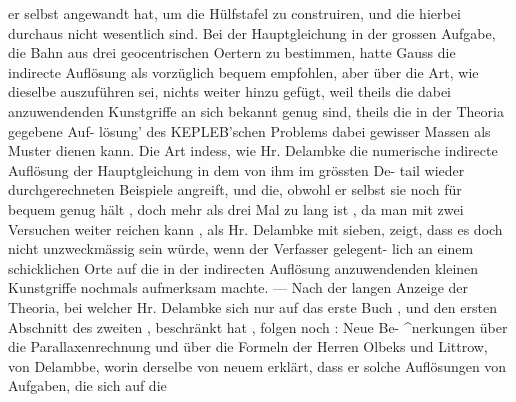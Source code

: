 \documentclass[12pt,a4paper]{article}
\begin{document}
er  selbst  angewandt  hat,  um  die  Hülfstafel  zu  construiren,  und  die hierbei  durchaus  nicht  wesentlich  sind.  Bei  der  Hauptgleichung  in  der  grossen  Aufgabe,  die  Bahn  aus drei  geocentrischen  Oertern  zu  bestimmen,  hatte  Gauss  die  indirecte  Auflösung  als  vorzüglich  bequem empfohlen,  aber  über  die  Art,  wie  dieselbe  auszuführen  sei,  nichts  weiter  hinzu  gefügt,  weil  theils  die dabei  anzuwendenden  Kunstgriffe  an  sich  bekannt  genug  sind,  theils  die  in  der  Theoria  gegebene  Auf- lösung' des  KEPLEB'schen  Problems  dabei  gewisser  Massen  als  Muster  dienen  kann.  Die  Art  indess,  wie Hr.  Delambke  die  numerische  indirecte  Auflösung  der  Hauptgleichung  in  dem  von  ihm  im  grössten  De- tail wieder  durchgerechneten  Beispiele  angreift,  und  die,  obwohl  er  selbst  sie  noch  für  bequem  genug hält ,  doch  mehr  als  drei  Mal  zu  lang  ist ,  da  man  mit  zwei  Versuchen  weiter  reichen  kann ,  als  Hr. Delambke  mit  sieben,  zeigt,  dass  es  doch  nicht  unzweckmässig  sein  würde,  wenn  der  Verfasser  gelegent- lich an  einem  schicklichen  Orte  auf  die  in  der  indirecten  Auflösung  anzuwendenden  kleinen  Kunstgriffe nochmals  aufmerksam  machte.  ---  Nach  der  langen  Anzeige  der  Theoria,  bei  welcher  Hr.  Delambke  sich nur  auf  das  erste  Buch ,  und  den  ersten  Abschnitt  des  zweiten ,  beschränkt  hat ,  folgen  noch :  Neue  Be- \textasciicircum{}nerkungen  über  die  Parallaxenrechnung  und  über  die  Formeln  der  Herren  Olbeks  und  Littrow,  von Delambbe,  worin  derselbe  von  neuem  erklärt,  dass  er  solche  Auflösungen  von  Aufgaben,  die  sich  auf  die

\vspace{0.5em}
\end{document}
